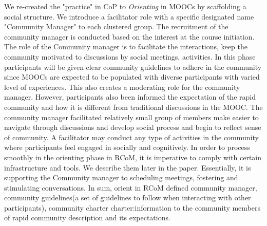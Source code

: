 \documentclass[format=acmsmall, review=false, screen=true]{acmart}
\begin{document}
We re-created the "practice" in CoP to \textit{Orienting} in MOOCs by scaffolding a social structure. We introduce a facilitator role with a specific designated name "Community Manager" to each clustered group. The recruitment of the community manager is conducted based on the interest at the course initiation. The role of the Community manager is to facilitate the interactions, keep the community motivated to discussions by social meetings, activities. In this phase participants will be given clear community guidelines to adhere in the community since MOOCs are expected to be populated with diverse participants with varied level of experiences. This also creates a moderating role for the community manager. However, participants also been informed the expectation of the rapid community and how it is different from traditional discussions in the MOOC. The community manager facilitated relatively small group of members make easier to navigate through discussions and develop social process and begin to reflect sense of community. A facilitator may conduct any type of activities in the community where participants feel engaged in socially and cognitively. In order to process smoothly in the orienting phase in RCoM, it is imperative to comply with certain infrastructure and tools. We describe them later in the paper. Essentially, it is supporting the Community manager to scheduling meetings, fostering and stimulating conversations. In sum, orient in RCoM defined community manager, community guidelines(a set of guidelines to follow when interacting with other participants), community charter charter:information to the community members of rapid community description and its expectations.
\end{document}

